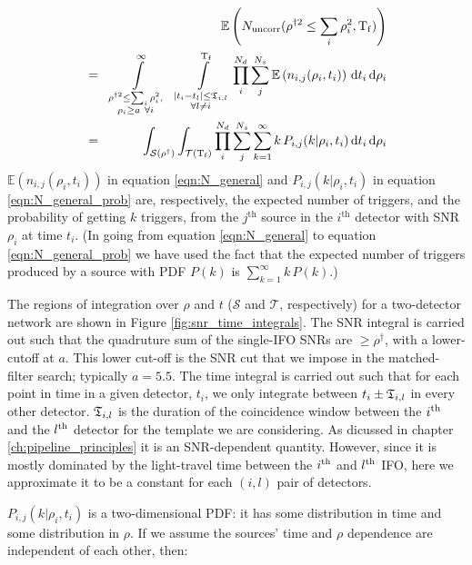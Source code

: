 \begin{eqnarray}
& & \mathbb{E}\left(N_{\mathrm{uncorr}}(\rho^{\dagger2} \leq \sum_i\rho_i^2, \mathrm{T_f} )\right) \nonumber \\
\label{eqn:N_general}
& = & \int\limits_{\substack{\rho^{\dagger2} \leq \sum_i\rho_i^2, \\ \rho_i \geq a ~ \forall i}}^{\infty}~~ \int\limits_{\substack{ |t_i - t_l| \leq \mathfrak{T}_{i,l} \\ \forall l \neq i}}^{\mathrm{T_f}} \prod_i^{N_d} \sum_j^{N_s} \mathbb{E}\left(n_{i,j}(\rho_i,t_i) \right) \,\mathrm{d} t_i \,\mathrm{d}\rho_i \\ 
\label{eqn:N_general_prob}
& = & \int_{\mathcal{S}(\rho^\dagger)} \int_{\mathcal{T}(\mathrm{T_f})} \prod_i^{N_d} \sum_j^{N_s}  \sum_{k=1}^{\infty} k\,P_{i,j}(k|\rho_i,t_i) \,\mathrm{d} t_i \,\mathrm{d}\rho_i 
\end{eqnarray}
$\mathbb{E}\left( n_{i,j}(\rho_i, t_i ) \right)$ in equation \ref{eqn:N_general} and $P_{i,j}(k|\rho_i,t_i)$ in equation \ref{eqn:N_general_prob} are, respectively, the expected number of triggers, and the probability of getting $k$ triggers, from the $j^{\mathrm{th}}$ source in the $i^{\mathrm{th}}$ detector with \ac{SNR} $\rho_i$ at time $t_i$. (In going from equation \ref{eqn:N_general} to equation \ref{eqn:N_general_prob} we have used the fact that the expected number of triggers produced by a source with \ac{PDF} $P(k)$ is $\sum_{k=1}^{\infty} k\,P(k)$.)

The regions of integration over $\rho$ and $t$ ($\mathcal{S}$ and $\mathcal{T}$, respectively) for a two-detector network are shown in Figure \ref{fig:snr_time_integrals}. The \ac{SNR} integral is carried out such that the quadruture sum of the single-\ac{IFO} \acp{SNR} are $\geq \rho^\dagger$, with a lower-cutoff at $a$. This lower cut-off is the \ac{SNR} cut that we impose in the matched-filter search; typically $a=5.5$. The time integral is carried out such that for each point in time in a given detector, $t_i$, we only integrate between $t_i \pm \mathfrak{T}_{i,l}$ in every other detector. $\mathfrak{T}_{i,l}$ is the duration of the coincidence window between the $i^{\mathrm{th}}$ and the $l^{\mathrm{th}}$ detector for the template we are considering. As dicussed in chapter \ref{ch:pipeline_principles} it is an \ac{SNR}-dependent quantity. However, since it is mostly dominated by the light-travel time between the $i^{\mathrm{th}}$ and $l^{\mathrm{th}}$ \ac{IFO}, here we approximate it to be a constant for each $(i,l)$ pair of detectors. 

$P_{i,j}(k|\rho_i,t_i)$ is a two-dimensional \ac{PDF}: it has some distribution in time and some distribution in $\rho$. If we assume the sources' time and $\rho$ dependence are independent of each other, then:

